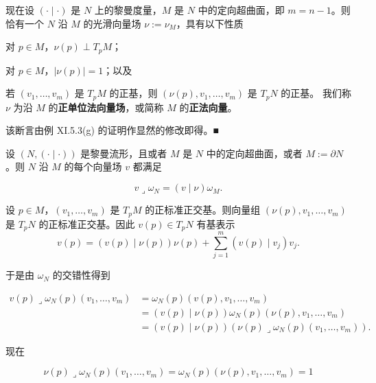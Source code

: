 \begin{remark}
现在设 $ (\cdot \mid \cdot) $ 是 $ N $ 上的黎曼度量，$ M $ 是 $ N $ 中的定向超曲面，即 $ m = n - 1 $。则恰有一个 $ N $ 沿 $ M $ 的光滑向量场 $ \nu := \nu_M $，具有以下性质

\begin{subitems}
\item

对 $ p \in M $，$ \nu(p) \perp T_p M $；

\item

对 $ p \in M $，$ |\nu(p)| = 1 $；以及

\item

若 $ (v_1, \dots, v_m) $ 是 $ T_p M $ 的正基，则 $ (\nu(p), v_1, \dots, v_m) $ 是 $ T_p N $ 的正基。
我们称 $ \nu $ 为沿 $ M $ 的\textbf{正单位法向量场}，或简称 $ M $ 的\textbf{正法向量}。

\proofhead
该断言由例 XI.5.3(g) 的证明作显然的修改即得。\nobreak\hspace{0.35em}■
\end{subitems}

\begin{items}
\item[（g）]

设 $ (N, (\cdot \mid \cdot)) $ 是黎曼流形，且或者 $ M $ 是 $ N $ 中的定向超曲面，或者 $ M := \partial N $。则 $ N $ 沿 $ M $ 的每个向量场 $ v $ 都满足

\[
v \lrcorner \omega_N = (v \mid \nu)\omega_M .
\]

\proofhead
设 $ p \in M $，$ (v_1, \dots, v_m) $ 是 $ T_p M $ 的正标准正交基。则向量组 $ (\nu(p), v_1, \dots, v_m) $ 是 $ T_p N $ 的正标准正交基。因此 $ v(p) \in T_p N $ 有基表示
\[
v(p) = (v(p) \mid \nu(p))\nu(p) + \sum_{j=1}^{m} (v(p) \mid v_j)v_j .
\]

于是由 $ \omega_N $ 的交错性得到

\begin{equation*}
\begin{aligned}
v(p) \lrcorner \omega_N(p)(v_1, \dots, v_m) &= \omega_N(p)(v(p), v_1, \dots, v_m) \\ &= (v(p) \mid \nu(p))\omega_N(p)(\nu(p), v_1, \dots, v_m) \\ &= (v(p) \mid \nu(p))(\nu(p) \lrcorner \omega_N(p)(v_1, \dots, v_m)) .
\end{aligned}
\end{equation*}

现在

\[
\nu(p) \lrcorner \omega_N(p)(v_1, \dots, v_m) = \omega_N(p)(\nu(p), v_1, \dots, v_m) = 1
\]


\end{items}
\end{remark}
